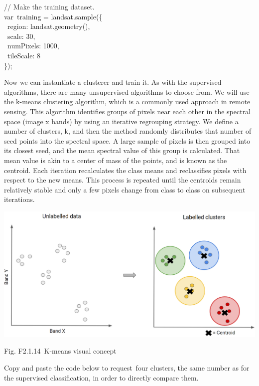 \documentclass[
  letterpaper,
  DIV=11,
  numbers=noendperiod]{scrreprt}
\begin{document}
// Make the training dataset.\\
var~training = landsat.sample(\{\\
\hspace*{0.333em} ~region: landsat.geometry(),\\
\hspace*{0.333em} ~scale: 30,\\
\hspace*{0.333em} ~numPixels: 1000,\\
\hspace*{0.333em} ~tileScale: 8\\
\});

Now we can instantiate a clusterer and train it. As with the supervised
algorithms, there are many unsupervised algorithms to choose from. We
will use the k-means clustering algorithm, which is a commonly used
approach in remote sensing. This algorithm identifies groups of pixels
near each other in the spectral space (image x bands) by using an
iterative regrouping strategy. We define a number of clusters, k, and
then the method randomly distributes that number of seed points into the
spectral space. A large sample of pixels is then grouped into its
closest seed, and the mean spectral value of this group is calculated.
That mean value is akin to a center of mass of the points, and is known
as the centroid. Each iteration recalculates the class means and
reclassifies pixels with respect to the new means. This process is
repeated until the centroids remain relatively stable and only a few
pixels change from class to class on subsequent iterations.

\includegraphics{./F2/image35.png}

Fig. F2.1.14~K-means visual concept

Copy and paste the code below to request~four clusters, the same number
as for the supervised classification, in order to directly compare them.
\end{document}
